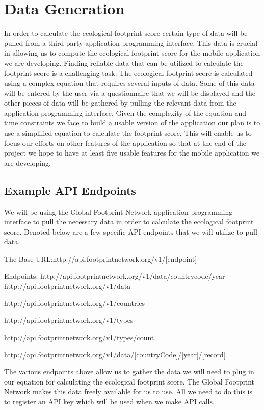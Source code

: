 \documentclass[onecolumn, draftclsnofoot,10pt, compsoc, tikz]{IEEEtran}
\begin{document}
\section{Data Generation}
In order to calculate the ecological footprint score certain type of data will be pulled from a third party application programming interface. This data is crucial in allowing us to compute the ecological footprint score for the mobile application we are developing. Finding reliable data that can be utilized to calculate the footprint score is a challenging task. The ecological footprint score is calculated using a complex equation that requires several inputs of data. Some of this data will be entered by the user via a questionnaire that we will be displayed and the other pieces of data will be gathered by pulling the relevant data from the application programming interface. Given the complexity of the equation and time constraints we face to build a usable version of the application our plan is to use a simplified equation to calculate the footprint score. This will enable us to focus our efforts on other features of the application so that at the end of the project we hope to have at least five usable features for the mobile application we are developing.  

\subsection{Example API Endpoints}
We will be using the Global Footprint Network application programming interface to pull the necessary data in order to calculate the ecological footprint score. Denoted below are a few specific API endpoints that we will utilize to pull data. 

The Base URL:http://api.footprintnetwork.org/v1/[endpoint]

Endpoints:
http://api.footprintnetwork.org/v1/data/countrycode/year
http://api.footprintnetwork.org/v1/data

http://api.footprintnetwork.org/v1/countries

http://api.footprintnetwork.org/v1/types

http://api.footprintnetwork.org/v1/types/count

http://api.footprintnetwork.org/v1/data/[countryCode]/[year]/[record]	

The various endpoints above allow us to gather the data we will need to plug in our equation for calculating the ecological footprint score. The Global Footprint Network makes this data freely available for us to use. All we need to do this is to register an API key which will be used when we make API calls. 
\end{document}
